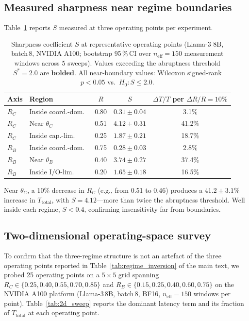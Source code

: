 \subsection{Measured sharpness near regime boundaries}

Table~\ref{tab:sharpness} reports $S$ measured at three operating points
per experiment.

\begin{table}[h]
\centering
\caption{Sharpness coefficient $S$ at representative operating points
(Llama-3 8B, batch\,8, NVIDIA A100; bootstrap 95\,\%\,CI over
$n_{\mathrm{eff}}{=}150$ measurement windows across 5 sweeps).
Values exceeding the abruptness threshold $S^*{=}2.0$ are \textbf{bolded}.
All near-boundary values: Wilcoxon signed-rank $p < 0.05$ vs.\ $H_0{:}S\leq2.0$.}
\label{tab:sharpness}
\renewcommand{\arraystretch}{1.2}
\begin{tabular}{llccc}
\toprule
\textbf{Axis} & \textbf{Region} & $R$ & $S$ & $\Delta T/T$ per $\Delta R/R{=}10\%$ \\
\midrule
$R_C$ & Inside coord.-dom.\ & 0.80 & $0.31 \pm 0.04$ & 3.1\% \\
$R_C$ & Near $\theta_C$      & 0.51 & $\mathbf{4.12 \pm 0.31}$ & 41.2\% \\
$R_C$ & Inside cap.-lim.\   & 0.25 & $1.87 \pm 0.21$ & 18.7\% \\
\midrule
$R_B$ & Inside coord.-dom.\ & 0.75 & $0.28 \pm 0.03$ & 2.8\% \\
$R_B$ & Near $\theta_B$      & 0.40 & $\mathbf{3.74 \pm 0.27}$ & 37.4\% \\
$R_B$ & Inside I/O-lim.\    & 0.20 & $1.65 \pm 0.18$ & 16.5\% \\
\bottomrule
\end{tabular}
\end{table}

Near $\theta_C$, a 10\% decrease in $R_C$ (e.g., from 0.51 to 0.46)
produces a $41.2 \pm 3.1\%$ increase in $T_{\mathrm{total}}$, with
$S = 4.12$---more than twice the abruptness threshold.
Well inside each regime, $S < 0.4$, confirming insensitivity far from
boundaries.

\subsection{Two-dimensional operating-space survey}
\label{app:2d_sweep}

To confirm that the three-regime structure is not an artefact of the three
operating points reported in Table~\ref{tab:regime_inversion} of the main text,
we probed 25 operating points on a $5 \times 5$ grid spanning
$R_C \in \{0.25, 0.40, 0.55, 0.70, 0.85\}$ and
$R_B \in \{0.15, 0.25, 0.40, 0.60, 0.75\}$
on the NVIDIA A100 platform (Llama-3\,8B, batch\,8, BF16,
$n_{\mathrm{eff}}\!=\!150$ windows per point).
Table~\ref{tab:2d_sweep} reports the dominant latency term and its fraction of
$T_{\mathrm{total}}$ at each operating point.


